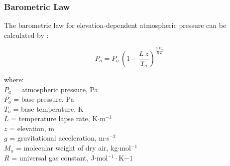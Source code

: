 \subsubsection{Barometric Law}
\label{sec:atm}
The barometric law for elevation-dependent atmospheric pressure can be calculated by \parencite{cavcar00}:

\begin{equation}
\label{eq:atm}
	P_a = P_o \: \left(1 - \frac{L \: z}{T_o}\right)^{\frac{g\: M_a}{R\: L}}
\end{equation}

\noindent where: \\
\indent $P_a$ = atmospheric pressure, Pa \\
\indent $P_o$ = base pressure, Pa \\
\indent $T_o$ = base temperature, K \\
\indent $L$ = temperature lapse rate, K$\cdot$m$^{-1}$ \\
\indent $z$ = elevation, m \\
\indent $g$ = gravitational acceleration, m$\cdot$s$^{-2}$ \\
\indent $M_a$ = molecular weight of dry air, kg$\cdot$mol$^{-1}$ \\
\indent $R$ = universal gas constant, J$\cdot$mol$^{-1}\cdot$K${-1}$ \\

